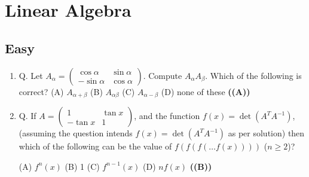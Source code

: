 \documentclass{article}
\begin{document}
\section{Linear Algebra}
\subsection{Easy}
\begin{enumerate}
\item Q. Let
$A_{\alpha} = \begin{pmatrix} \cos \alpha & \sin \alpha \\ - \sin \alpha & \cos \alpha \end{pmatrix}$.
Compute $A_{\alpha} A_{\beta}$. Which of the following is correct?
(A) $A_{\alpha+\beta}$
(B) $A_{\alpha\beta}$
(C) $A_{\alpha-\beta}$
(D) none of these \hfill \textbf{((A))}
\item Q. If
$A=\begin{pmatrix} 1 & \tan x \\ -\tan x & 1 \end{pmatrix}$,
and the function $f(x) = \det(A^T A^{-1})$, (assuming the question intends $f(x) = \det(A^T A^{-1})$ as per solution)
then which of the following can be the value of
$f(f(f(\dots f(x))))$ ($n \ge 2$)?

(A) $f^n(x)$
(B) 1
(C) $f^{n-1}(x)$
(D) $n f(x)$ \hfill \textbf{((B))}
\end{enumerate}
\end{document}
